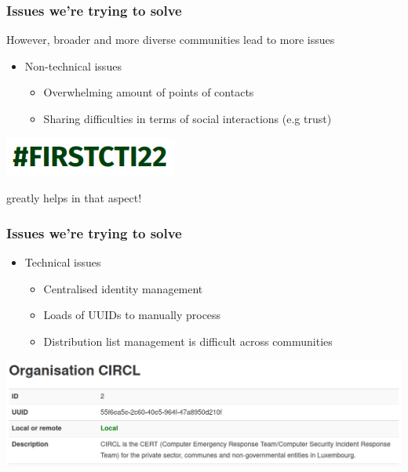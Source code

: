 \begin{frame}
\frametitle{Issues we're trying to solve}
    However, broader and more diverse communities lead to more issues
    \begin{itemize}
        \item {Non-technical issues}
        \begin{itemize}
            \item Overwhelming amount of points of contacts
            \item Sharing difficulties in terms of social interactions (e.g trust)
        \end{itemize}
    \end{itemize}
    \vspace{1em}
    \begin{minipage}{0.27\textwidth}
        \includegraphics[scale=0.4]{pictures/firstcti-hastag.png}
    \end{minipage}
    \begin{minipage}{0.6\textwidth}
        {\large greatly helps in that aspect!}
    \end{minipage}
\end{frame}

\begin{frame}
\frametitle{Issues we're trying to solve}
    \begin{itemize}
        \item {Technical issues}
        \begin{itemize}
            \item Centralised identity management 
            \item Loads of UUIDs to manually process
            \item Distribution list management is difficult across communities
        \end{itemize}
    \end{itemize}
    \begin{center}
        \includegraphics[width=1.0\linewidth]{pictures/org-circl.png}
    \end{center}
\end{frame}

